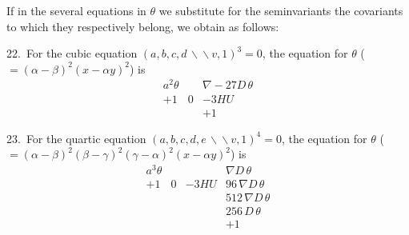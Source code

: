 \documentclass[11pt,a4paper]{article}
\theoremstyle{plain}
\theoremstyle{definition}
\theoremstyle{remark}
\begin{document}
If in the several equations in $\theta$ we substitute for the seminvariants the covariants to which they respectively belong, we obtain as follows:

22.\ For the cubic equation $(a,b,c,d\,\backslash\!\!\backslash v, 1)^3=0$, the equation for $\theta$ ($=(\alpha-\beta)^2(x-\alpha y)^2$) is
\[
\begin{array}{ccc}
a^2\theta & & \nabla-27D\,\theta\\
+1 & 0 & -3HU\\
& & +1
\end{array}
\]

23.\ For the quartic equation $(a,b,c,d,e\,\backslash\!\!\backslash v, 1)^4=0$, the equation for $\theta$ ($=(\alpha-\beta)^2(\beta-\gamma)^2(\gamma-\alpha)^2(x-\alpha y)^2$) is
\[
\begin{array}{cccc}
a^3\theta & & & \nabla D\,\theta\\
+1 & 0 & -3HU & 96\,\nabla D\,\theta\\
& & & 512\,\nabla D\,\theta\\
& & & 256\,D\,\theta\\
& & & +1
\end{array}
\]

\newpage
\setcounter{page}{308}
\end{document}
